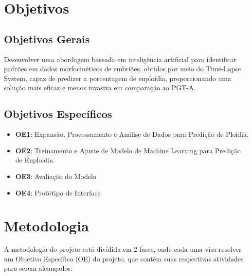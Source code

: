 \section{Objetivos}

\subsection{Objetivos Gerais}
Desenvolver uma abordagem baseada em inteligência artificial para identificar padrões em dados morfocinéticos de embriões, obtidos por meio do Time-Lapse System, capaz de predizer a porcentagem de euploidia, proporcionando uma solução mais eficaz e menos invasiva em comparação ao PGT-A.

\subsection{Objetivos Específicos}
\begin{itemize}
    \item \textbf{OE1}: Expansão, Processamento e Análise de Dados para Predição de Ploidia.
    \item \textbf{OE2}: Treinamento e Ajuste de Modelo de Machine Learning para Predição de Euploidia.
    \item \textbf{OE3}: Avaliação do Modelo
    \item \textbf{OE4}: Protótipo de Interface
\end{itemize}

\section{Metodologia}
A metodologia do projeto está dividida em 2 fases, onde cada uma visa resolver um Objetivo Específico (OE) do projeto, que contém suas respectivas atividades para serem alcançados:

